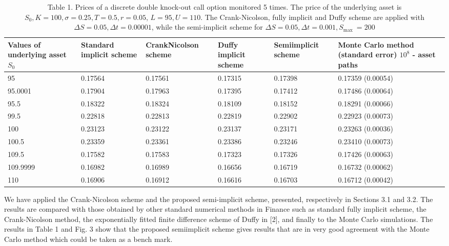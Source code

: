 \documentclass[10pt]{article}
\begin{document}
\begin{table}[h]
\begin{center}
\begin{tabular}{|l|l|l|l|l|l|}
\hline
Values of underlying asset $S_{0}$ & Standard implicit scheme & CrankNicolson scheme & Duffy implicit scheme & Semiimplicit scheme & Monte Carlo method (standard error) $10^{8}$ - asset paths \\
\hline
95 & 0.17564 & 0.17561 & 0.17315 & 0.17398 & 0.17359 (0.00054) \\
\hline
95.0001 & 0.17904 & 0.17963 & 0.17395 & 0.17412 & 0.17486 (0.00064) \\
\hline
95.5 & 0.18322 & 0.18324 & 0.18109 & 0.18152 & 0.18291 (0.00066) \\
\hline
99.5 & 0.22818 & 0.22813 & 0.22819 & 0.22902 & 0.22923 (0.00073) \\
\hline
100 & 0.23123 & 0.23122 & 0.23137 & 0.23171 & 0.23263 (0.00036) \\
\hline
100.5 & 0.23359 & 0.23361 & 0.23386 & 0.23246 & 0.23410 (0.00073) \\
\hline
109.5 & 0.17582 & 0.17583 & 0.17323 & 0.17326 & 0.17426 (0.00063) \\
\hline
109.9999 & 0.16982 & 0.16989 & 0.16656 & 0.16719 & 0.16732 (0.00062) \\
\hline
110 & 0.16906 & 0.16912 & 0.16616 & 0.16703 & 0.16712 (0.00042) \\
\hline
\end{tabular}
\captionsetup{labelformat=empty}
\caption{Table 1. Prices of a discrete double knock-out call option monitored 5 times. The price of the underlying asset is $S_{0}, K=100, \sigma=0.25, T=0.5, r=0.05$, $L=95, U=110$. The Crank-Nicolson, fully implicit and Duffy scheme are applied with $\Delta S=0.05, \Delta t=0.00001$, while the semi-implicit scheme for $\Delta S=0.05, \Delta t=0.001, S_{\text {max }}=200$}
\end{center}
\end{table}

We have applied the Crank-Nicolson scheme and the proposed semi-implicit scheme, presented, respectively in Sections 3.1 and 3.2. The results are compared with those obtained by other standard numerical methods in Finance such as standard fully implicit scheme, the Crank-Nicolson method, the exponentially fitted finite difference scheme of Duffy in [2], and finally to the Monte Carlo simulations. The results in Table 1 and Fig. 3 show that the proposed semiimplicit scheme gives results that are in very good agreement with the Monte Carlo method which could be taken as a bench mark.
\end{document}
